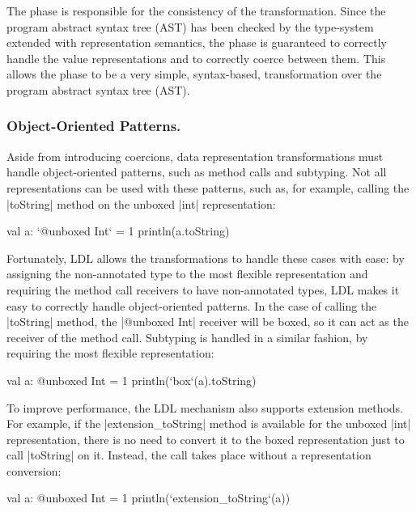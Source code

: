 The \commit{} phase is responsible for the consistency of the transformation. Since the program abstract syntax tree (AST) has been checked by the type-system extended with representation semantics, the \commit{} phase is guaranteed to correctly handle the value representations and to correctly coerce between them. This allows the \commit{} phase to be a very simple, syntax-based, transformation over the program abstract syntax tree (AST).

\subsubsection{Object-Oriented Patterns.}

Aside from introducing coercions, data representation transformations must handle object-oriented patterns, such as method calls and subtyping. Not all representations can be used with these patterns, such as, for example, calling the |toString| method on the unboxed |int| representation:

\begin{lstlisting-nobreak}
val a: `@unboxed Int` = 1
println(a.toString)
\end{lstlisting-nobreak}

Fortunately, LDL allows the transformations to handle these cases with ease: by assigning the non-annotated type to the most flexible representation and requiring the method call receivers to have non-annotated types, LDL makes it easy to correctly handle object-oriented patterns. In the case of calling the |toString| method, the |@unboxed Int| receiver will be boxed, so it can act as the receiver of the method call. Subtyping is handled in a similar fashion, by requiring the most flexible representation:

\begin{lstlisting-nobreak}
val a: @unboxed Int = 1
println(`box`(a).toString)
\end{lstlisting-nobreak}

To improve performance, the LDL mechanism also supports extension methods. For example, if the |extension_toString| method is available for the unboxed |int| representation, there is no need to convert it to the boxed representation just to call |toString| on it. Instead, the call takes place without a representation conversion:

\begin{lstlisting-nobreak}
val a: @unboxed Int = 1
println(`extension_toString`(a))
\end{lstlisting-nobreak}

